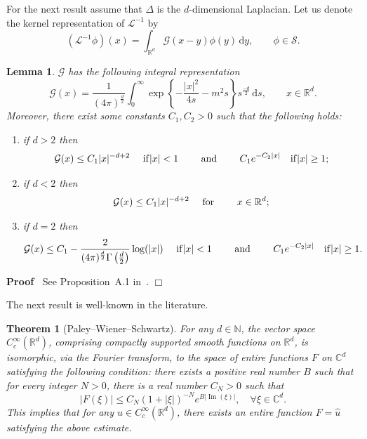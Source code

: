\documentclass{article}
\newcommand{\infixand}{\text{ and }}
\newcommand{\mathd}{\mathrm{d}}
\newcommand{\tmop}[1]{\ensuremath{\operatorname{#1}}}
\newenvironment{enumeratenumeric}{\begin{enumerate}[1.] }{\end{enumerate}}
\newenvironment{proof}{\noindent\textbf{Proof\ }}{\hspace*{\fill}$\Box$\medskip}
\newtheorem{lemma}{Lemma}
\newtheorem{theorem}{Theorem}
\begin{document}
For the next result assume that $\Delta$ is the $d$-dimensional Laplacian. Let
us denote the kernel representation of $\mathcal{L}^{- 1}$ by
\[ (\mathcal{L}^{- 1} \phi) (x) = \int_{\mathbb{R}^d} \mathcal{G}  (x - y) \phi (y) \, 
   \mathd y, \qquad \phi \in \mathcal{S} . \]
\begin{lemma}
  \label{lem-AY2002} $\mathcal{G}$ has the following integral representation
  \[ \mathcal{G} (x) = \frac{1}{{(4 \pi)^{\frac{d}{2}}} } \int_0^{\infty} \exp \left\{ -
     \frac{| x |^2}{4 s} - m^2 s \right\} s^{\frac{- d}{2}} \, \mathd s, \qquad
     x \in \mathbb{R}^d . \]
  Moreover, there exist some constants $C_1, C_2 > 0$ such that the following
  holds:
  \begin{enumeratenumeric}
    \item if $d > 2$ then
    \[ \mathcal{G} (x) \leq C_1 | x |^{- d + 2}  \textrm{ \quad \tmop{if}} | x | < 1
       \textrm{\qquad \infixand}  \qquad C_1 e^{- C_2 | x | } \quad 
       \textrm{\tmop{if}} | x | \geq 1; \]
    \item if $d < 2$ then
    \[ \mathcal{G} (x) \leq C_1 | x |^{- d + 2}  \textrm{ \quad \tmop{for} \qquad } x
       \in \mathbb{R}^d; \]
    \item if $d = 2$ then
    \[ \mathcal{G} (x) \leq C_1 - \frac{2}{(4 \pi)^{\frac{d}{2}} \Gamma \left(
       \frac{d}{2} \right)} \log (| x |)  \textrm{ \quad \tmop{if}} | x | < 1
       \textrm{\qquad \infixand}  \qquad C_1 e^{- C_2 | x | } \quad 
       \textrm{\tmop{if}} | x | \geq 1. \]
  \end{enumeratenumeric}
\end{lemma}

\begin{proof}
  See Proposition~A.1 in~{\cite{AY2002}}.
\end{proof}

The next result is well-known in the literature.

\begin{theorem}[Paley--Wiener--Schwartz]
  \label{thm-PWS} For any $d \in \mathbb{N}$, the vector space $C_c^{\infty}(\mathbb{R}^d)$, comprising compactly supported smooth functions on $\mathbb{R}^d$, is isomorphic, via the Fourier transform, to the space of entire functions $F$ on $\mathbb{C}^d$ satisfying the following condition: there exists a positive
  real number $B$ such that for every integer $N > 0$, there is a real number $C_N > 0$ such that
  \begin{equation}
    | F (\xi) | \leqslant C_N (1 + | \xi |)^{-
    N} e^{B | \tmop{Im} (\xi) |}, \quad \forall \xi \in \mathbb{C}^d. \label{est-PWS}
  \end{equation}
  This implies that for any $u \in C_c^{\infty} (\mathbb{R}^d)$, there exists an entire function $F = \hat{u}$ satisfying the above estimate.
\end{theorem}
\end{document}
